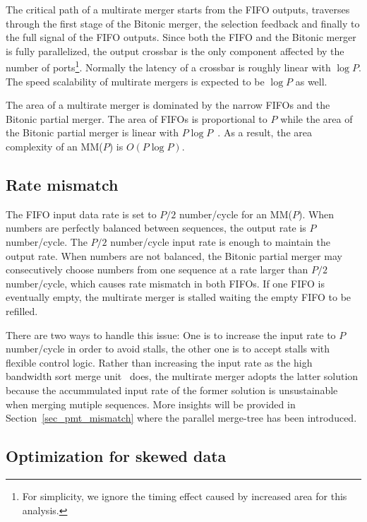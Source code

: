 \documentclass[10pt, conference]{IEEEtran}
\begin{document}
The critical path of a multirate merger starts from the FIFO outputs,
traverses through the first stage of the Bitonic merger, the selection feedback and finally to the full signal of the FIFO outputs.
Since both the FIFO and the Bitonic merger is fully parallelized, the output crossbar is the only component affected
by the number of ports\footnote{For simplicity, we ignore the timing effect caused by increased area for this analysis.}.
Normally the latency of a crossbar is roughly linear with $\log P$.
The speed scalability of multirate mergers is expected to be $\log P$ as well.

The area of a multirate merger is dominated by the narrow FIFOs and the Bitonic partial merger.
The area of FIFOs is proportional to $P$ while the area of the Bitonic partial merger is linear with $P \log P$~\cite{Farmahini-Farahani2013}.
As a result, the area complexity of an MM($P$) is $O(P \log P)$.

\subsection{Rate mismatch}\label{sec_pmerge_mismatch}

The FIFO input data rate is set to $P/2$ number/cycle for an MM($P$).
When numbers are perfectly balanced between sequences, the output rate is $P$ number/cycle.
The $P/2$ number/cycle input rate is enough to maintain the output rate.
When numbers are not balanced, the Bitonic partial merger may consecutively choose numbers from one sequence at a rate larger than $P/2$ number/cycle,
which causes rate mismatch in both FIFOs. If one FIFO is eventually empty, the multirate merger is stalled waiting the empty FIFO to be refilled.

There are two ways to handle this issue:
One is to increase the input rate to $P$ number/cycle in order to avoid stalls,
the other one is to accept stalls with flexible control logic.
Rather than increasing the input rate as the high bandwidth sort merge unit~\cite{Casper2014} does,
the multirate merger adopts the latter solution
because the accummulated input rate of the former solution is unsustainable when merging mutiple sequences.
More insights will be provided in Section~\ref{sec_pmt_mismatch} where the parallel merge-tree has been introduced.

\subsection{Optimization for skewed data}\label{sec_skew_opt}
\end{document}
